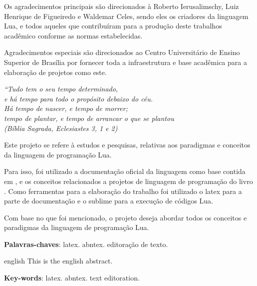 \documentclass[
12pt, %
openright, %
oneside, %
a4paper, %
english, %
brazil, %
]{abntex2}
\begin{document}
\begin{agradecimentos}
Os agradecimentos principais são direcionados à Roberto Ierusalimschy, Luiz Henrique de Figueiredo e Waldemar Celes, sendo eles os criadores da linguagem Lua, e todos aqueles que contribuíram para a produção deste trabalhos acadêmico conforme
as normas estabelecidas.

Agradecimentos especiais são direcionados ao Centro Universitário de Ensino Superior de Brasília por fornecer toda a infraestrutura e base acadêmica para a elaboração de projetos como este.

\end{agradecimentos}

\begin{epigrafe}
    \vspace*{\fill}
\begin{flushright}
\textit{``Tudo tem o seu tempo determinado, \\
e há tempo para todo o propósito debaixo do céu. \\
Há tempo de nascer, e tempo de morrer; \\
tempo de plantar, e tempo de arrancar o que se plantou\\
(Bíblia Sagrada, Eclesiastes 3, 1 e 2)}
\end{flushright}
\end{epigrafe}


\begin{resumo}
Este projeto se refere à estudos e pesquisas, relativas aos paradigmas e conceitos da linguagem de programação Lua. 

Para isso, foi utilizado a documentação oficial da linguagem como base contida em \cite{Lua_Org}, e os conceitos relacionados a projetos de linguagem de programação do livro \cite{Sebesta}. Como ferramentas para a elaboração do trabalho foi utilizado o latex para a parte de documentação e o sublime para a execução de códigos Lua.

Com base no que foi mencionado, o projeto deseja abordar todos os conceitos e paradigmas da linguagem de programação Lua.

 \noindent
 \textbf{Palavras-chaves}: latex. abntex. editoração de texto.
\end{resumo}

\begin{resumo}[Abstract]
 \begin{otherlanguage*}{english}
   This is the english abstract.

   \vspace{\onelineskip}
 
   \noindent
   \textbf{Key-words}: latex. abntex. text editoration.
 \end{otherlanguage*}
\end{resumo}
\end{document}
